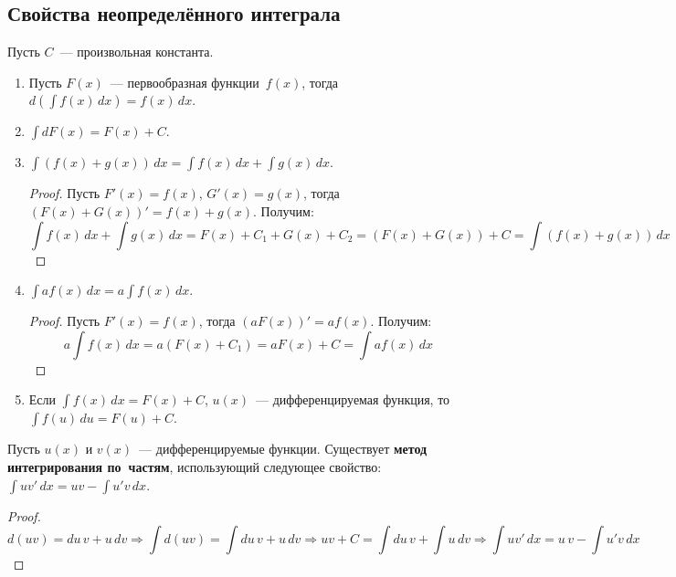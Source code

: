 \subsection{Свойства неопределённого интеграла}
Пусть $C$~--- произвольная константа.
\begin{enumerate}
	\item Пусть $F(x)$~--- первообразная функции~$f(x)$, тогда $d \left( \int f(x)\,dx \right) = f(x)\,dx$.
	
	\item $\int dF(x) = F(x) + C$.
	
	\item $\int (f(x) + g(x))\,dx = \int f(x)\,dx + \int g(x)\,dx$.
	\begin{proof}
	Пусть $F'(x) = f(x)$, $G'(x) = g(x)$, тогда $(F(x) + G(x))' = f(x) + g(x)$.
	Получим:
	\begin{equation*}
	\int f(x)\,dx + \int g(x)\,dx = F(x) + C_1 + G(x) + C_2 = (F(x) + G(x)) + C = \int (f(x) + g(x))\,dx
	\end{equation*}
	\end{proof}
	
	\item $\int a f(x)\,dx = a \int f(x)\,dx$.
	\begin{proof}
	Пусть $F'(x) = f(x)$, тогда $(a F(x))' = a f(x)$.
	Получим:
	\begin{equation*}
	a \int f(x)\,dx = a(F(x) + C_1) = a F(x) + C = \int a f(x)\,dx
	\end{equation*}
	\end{proof}
	
	\item Если $\int f(x)\,dx = F(x) + C$, $u(x)$~--- дифференцируемая функция, то $\int f(u)\,du = F(u) + C$.
\end{enumerate}

Пусть $u(x)$ и $v(x)$~--- дифференцируемые функции.
Существует \textbf{метод интегрирования по~частям}, использующий следующее свойство:
$\int uv'\,dx = uv - \int u'v\,dx$.
\begin{proof}
\begin{equation*}
d(uv) = du\,v + u\,dv \Rightarrow
\int d(uv) = \int du\,v + u\,dv \Rightarrow
uv + C = \int du\,v + \int u\,dv \Rightarrow
\int uv'\,dx = u\,v - \int u'v\,dx
\end{equation*}
\end{proof}